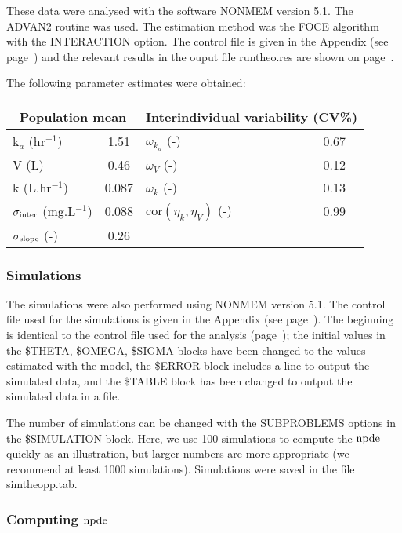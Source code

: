 \bigskip These data were analysed with the software {\sf NONMEM} version 5.1. The ADVAN2 routine was used. The estimation method was the {\sf FOCE} algorithm with the {\sf INTERACTION} option. The control file is given in the Appendix (see page~\pageref{sec:appanalctr}) and the relevant results in the ouput file {\sf runtheo.res} are shown on page~\pageref{sec:appresnonmem}.

The following parameter estimates were obtained:
\begin{center}
\begin{tabular} {l c | l c}
\hline 
\multicolumn{2}{c}{Population mean} & \multicolumn{2}{c}{Interindividual
variability (CV\%)} \\
\hline 
k$_a$ (hr$^{-1}$) & 1.51 & $\omega_{k_a}$ (-) & 0.67 \\
V (L) & 0.46 & $\omega_{V}$ (-) & 0.12 \\
k (L.hr$^{-1}$) & 0.087 & $\omega_{k}$ (-) & 0.13 \\
$\sigma_{\rm inter}$ (mg.L$^{-1}$) & 0.088 & cor$(\eta_{k},\eta_{V})$ (-) & 0.99 \\
$\sigma_{\rm slope}$ (-) & 0.26 & &\\
\hline
\end{tabular}
\end{center}

\subsubsection{Simulations}

\hskip 18pt The simulations were also performed using {\sf NONMEM} version 5.1. The control file used for the simulations is given in the Appendix (see page~\pageref{sec:appsimulctr}). The beginning is identical to the control file used for the analysis (page~\pageref{sec:appresnonmem}); the initial values in the {\sf \$THETA}, {\sf \$OMEGA}, {\sf \$SIGMA} blocks have been changed to the values estimated with the model, the {\sf \$ERROR} block includes a line to output the simulated data, and the {\sf \$TABLE} block has been changed to output the simulated data in a file.

The number of simulations can be changed with the {\sf SUBPROBLEMS} options in the {\sf \$SIMULATION} block. Here, we use 100 simulations to compute the ${\rm npde}$ quickly as an illustration, but larger numbers are more appropriate (we recommend at least 1000 simulations). Simulations were saved in the file {\sf simtheopp.tab}.

\subsubsection{Computing ${\rm npde}$} \label{sec:expde}

